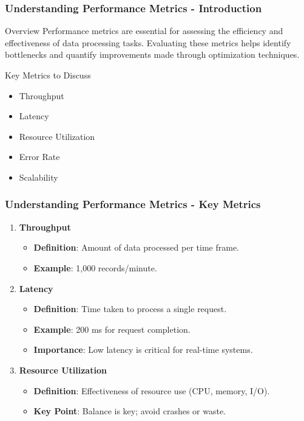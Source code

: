 \documentclass[aspectratio=169]{beamer}
\begin{document}
\begin{frame}[fragile]
    \frametitle{Understanding Performance Metrics - Introduction}
    \begin{block}{Overview}
        Performance metrics are essential for assessing the efficiency and effectiveness of data processing tasks. Evaluating these metrics helps identify bottlenecks and quantify improvements made through optimization techniques.
    \end{block}
    \begin{block}{Key Metrics to Discuss}
        \begin{itemize}
            \item Throughput
            \item Latency
            \item Resource Utilization
            \item Error Rate
            \item Scalability
        \end{itemize}
    \end{block}
\end{frame}

\begin{frame}[fragile]
    \frametitle{Understanding Performance Metrics - Key Metrics}
    \begin{enumerate}
        \item \textbf{Throughput}
            \begin{itemize}
                \item \textbf{Definition}: Amount of data processed per time frame.
                \item \textbf{Example}: 1,000 records/minute.
            \end{itemize}
        
        \item \textbf{Latency}
            \begin{itemize}
                \item \textbf{Definition}: Time taken to process a single request.
                \item \textbf{Example}: 200 ms for request completion.
                \item \textbf{Importance}: Low latency is critical for real-time systems.
            \end{itemize}
        
        \item \textbf{Resource Utilization}
            \begin{itemize}
                \item \textbf{Definition}: Effectiveness of resource use (CPU, memory, I/O).
                \item \textbf{Key Point}: Balance is key; avoid crashes or waste.
            \end{itemize}
    \end{enumerate}
\end{frame}
\end{document}
